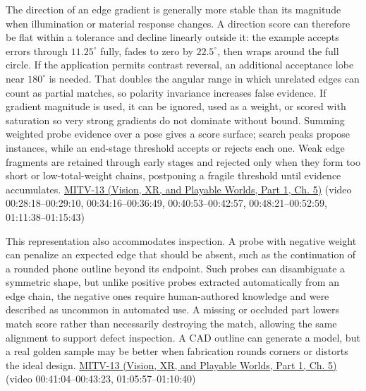The direction of an edge gradient is generally more stable than its magnitude when illumination or material response changes. A direction score can therefore be flat within a tolerance and decline linearly outside it: the example accepts errors through \(11.25^\circ\) fully, fades to zero by \(22.5^\circ\), then wraps around the full circle. If the application permits contrast reversal, an additional acceptance lobe near \(180^\circ\) is needed. That doubles the angular range in which unrelated edges can count as partial matches, so polarity invariance increases false evidence. If gradient magnitude is used, it can be ignored, used as a weight, or scored with saturation so very strong gradients do not dominate without bound. Summing weighted probe evidence over a pose gives a score surface; search peaks propose instances, while an end-stage threshold accepts or rejects each one. Weak edge fragments are retained through early stages and rejected only when they form too short or low-total-weight chains, postponing a fragile threshold until evidence accumulates. \href{../07-Vision-XR-and-Playable-Worlds-P01/main.pdf\#nameddest=04-visual-computing-ii-ch036-mitv-13---object-detection-recognition-and-pose-determination-patquick-us-7016539}{MITV-13 (Vision, XR, and Playable Worlds, Part 1, Ch. 5)} (video 00:28:18--00:29:10, 00:34:16--00:36:49, 00:40:53--00:42:57, 00:48:21--00:52:59, 01:11:38--01:15:43)

This representation also accommodates inspection. A probe with negative weight can penalize an expected edge that should be absent, such as the continuation of a rounded phone outline beyond its endpoint. Such probes can disambiguate a symmetric shape, but unlike positive probes extracted automatically from an edge chain, the negative ones require human-authored knowledge and were described as uncommon in automated use. A missing or occluded part lowers match score rather than necessarily destroying the match, allowing the same alignment to support defect inspection. A CAD outline can generate a model, but a real golden sample may be better when fabrication rounds corners or distorts the ideal design. \href{../07-Vision-XR-and-Playable-Worlds-P01/main.pdf\#nameddest=04-visual-computing-ii-ch036-mitv-13---object-detection-recognition-and-pose-determination-patquick-us-7016539}{MITV-13 (Vision, XR, and Playable Worlds, Part 1, Ch. 5)} (video 00:41:04--00:43:23, 01:05:57--01:10:40)

